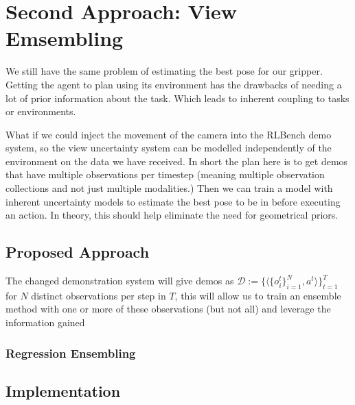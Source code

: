 \section{Second Approach: View Emsembling}
We still have the same problem of estimating the best pose for our gripper. Getting the agent to plan using its environment has the drawbacks of needing a lot of prior information about the task. Which leads to inherent coupling to tasks or environments.

What if we could inject the movement of the camera into the RLBench demo system, so the view uncertainty system can be modelled independently of the environment on the data we have received. In short the plan here is to get demos that have multiple observations per timestep (meaning multiple observation collections and not just multiple modalities.) Then we can train a model with inherent uncertainty models to estimate the best pose to be in before executing an action. In theory, this should help eliminate the need for geometrical priors.

\subsection{Proposed Approach}
The changed demonstration system will give demos as \( \mathcal{D} := \{\langle \{o_i^t\}_{i = 1}^{N}, a^t\rangle\}_{t = 1}^{T}\) for $N$ distinct observations per step in $T$, this will allow us to train an ensemble method with one or more of these observations (but not all) and leverage the information gained 

\subsubsection{Regression Ensembling}


\subsection{Implementation}
